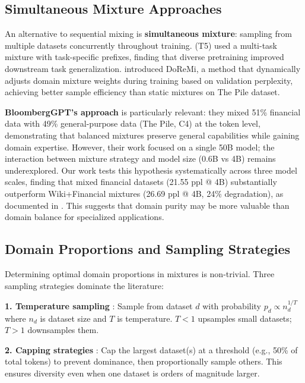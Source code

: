\subsection{Simultaneous Mixture Approaches}

An alternative to sequential mixing is \textbf{simultaneous mixture}: sampling from multiple datasets concurrently throughout training. \textcite{raffel2020exploring} (T5) used a multi-task mixture with task-specific prefixes, finding that diverse pretraining improved downstream task generalization. \textcite{xie2023doremi} introduced DoReMi, a method that dynamically adjusts domain mixture weights during training based on validation perplexity, achieving better sample efficiency than static mixtures on The Pile dataset.

\textbf{BloombergGPT's approach} \parencite{wu2023bloomberggpt} is particularly relevant: they mixed 51\% financial data with 49\% general-purpose data (The Pile, C4) at the token level, demonstrating that balanced mixtures preserve general capabilities while gaining domain expertise. However, their work focused on a single 50B model; the interaction between mixture strategy and model size (0.6B vs 4B) remains underexplored. Our work tests this hypothesis systematically across three model scales, finding that mixed financial datasets (21.55 ppl @ 4B) substantially outperform Wiki+Financial mixtures (26.69 ppl @ 4B, 24\% degradation), as documented in . This suggests that domain purity may be more valuable than domain balance for specialized applications.

\subsection{Domain Proportions and Sampling Strategies}

Determining optimal domain proportions in mixtures is non-trivial. Three sampling strategies dominate the literature:

\textbf{1. Temperature sampling} \parencite{arivazhagan2019massively}: Sample from dataset $d$ with probability $p_d \propto n_d^{1/T}$ where $n_d$ is dataset size and $T$ is temperature. $T < 1$ upsamples small datasets; $T > 1$ downsamples them.

\textbf{2. Capping strategies} \parencite{longpre2023pretrainer}: Cap the largest dataset(s) at a threshold (e.g., 50\% of total tokens) to prevent dominance, then proportionally sample others. This ensures diversity even when one dataset is orders of magnitude larger.

